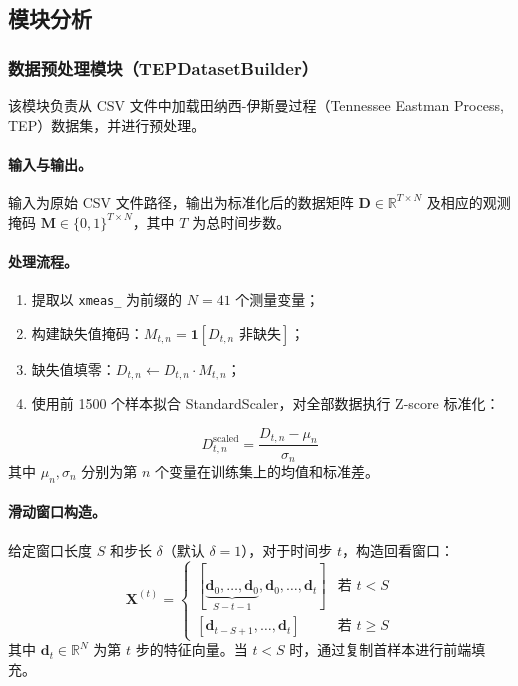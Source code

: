 \documentclass[UTF8]{ctexart}
\begin{document}
\subsection{模块分析}

\subsubsection{数据预处理模块（TEPDatasetBuilder）}

该模块负责从 CSV 文件中加载田纳西-伊斯曼过程（Tennessee Eastman Process, TEP）数据集，并进行预处理。

\paragraph{输入与输出。}
输入为原始 CSV 文件路径，输出为标准化后的数据矩阵 $\mathbf{D} \in \mathbb{R}^{T \times N}$ 及相应的观测掩码 $\mathbf{M} \in \{0,1\}^{T \times N}$，其中 $T$ 为总时间步数。

\paragraph{处理流程。}
\begin{enumerate}
    \item 提取以 \texttt{xmeas\_} 为前缀的 $N=41$ 个测量变量；
    \item 构建缺失值掩码：$M_{t,n} = \mathbf{1}[D_{t,n} \text{ 非缺失}]$；
    \item 缺失值填零：$D_{t,n} \leftarrow D_{t,n} \cdot M_{t,n}$；
    \item 使用前 1500 个样本拟合 StandardScaler，对全部数据执行 Z-score 标准化：
\end{enumerate}
\begin{equation}
    D_{t,n}^{\text{scaled}} = \frac{D_{t,n} - \mu_n}{\sigma_n}
\end{equation}
其中 $\mu_n, \sigma_n$ 分别为第 $n$ 个变量在训练集上的均值和标准差。

\paragraph{滑动窗口构造。}
给定窗口长度 $S$ 和步长 $\delta$（默认 $\delta=1$），对于时间步 $t$，构造回看窗口：
\begin{equation}
    \mathbf{X}^{(t)} =
    \begin{cases}
        [\underbrace{\mathbf{d}_0, \ldots, \mathbf{d}_0}_{S-t-1}, \mathbf{d}_0, \ldots, \mathbf{d}_t] & \text{若 } t < S \\[6pt]
        [\mathbf{d}_{t-S+1}, \ldots, \mathbf{d}_t] & \text{若 } t \geq S
    \end{cases}
\end{equation}
其中 $\mathbf{d}_t \in \mathbb{R}^N$ 为第 $t$ 步的特征向量。当 $t < S$ 时，通过复制首样本进行前端填充。
\end{document}
